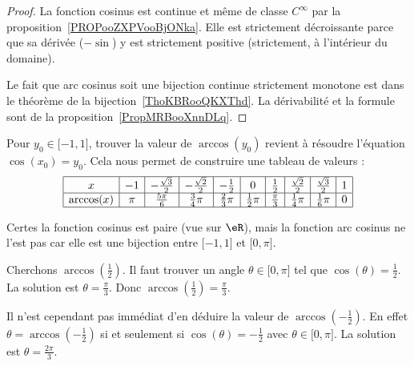 	\begin{proof}
		La fonction cosinus est continue et même de classe \(  C^{\infty}\) par la proposition~\ref{PROPooZXPVooBjONka}. Elle est strictement décroissante parce que sa dérivée (\( -\sin\)) y est strictement positive (strictement, à l'intérieur du domaine).

		Le fait que arc cosinus soit une bijection continue strictement monotone est dans le théorème de la bijection~\ref{ThoKBRooQKXThd}. La dérivabilité et la formule sont de la proposition~\ref{PropMRBooXnnDLq}.
	\end{proof}

	Pour \( y_0\in\mathopen[ -1 , 1 \mathclose]\), trouver la valeur de \( \arccos(y_0)\) revient à résoudre l'équation \( \cos(x_0)=y_0\). Cela nous permet de construire une tableau de valeurs :
	\begin{equation*}
		\begin{array}[]{|c|c|c|c|c|c|c|c|c|c|}
			\hline
			x          & -1  & -\frac{ \sqrt{3} }{2} & -\frac{ \sqrt{2} }{2} & -\frac{ 1 }{2}     & 0                & \frac{ 1 }{2}     & \frac{ \sqrt{2} }{2} & \frac{ \sqrt{3} }{2} & 1 \\
			\hline
			\arccos(x) & \pi & \frac{ 5\pi }{ 6 }    & \frac{ 3 }{ 4 }\pi    & \frac{ 2 }{ 3 }\pi & \frac{ 1 }{2}\pi & \frac{ \pi }{ 3 } & \frac{1}{ 4 }\pi     & \frac{1}{ 6 }\pi     & 0 \\
			\hline
		\end{array}
	\end{equation*}

	\begin{remark}
		Certes la fonction cosinus est paire (vue sur \( \eR\)), mais la fonction arc cosinus ne l'est pas car elle est une bijection entre \(\mathopen[ -1 , 1 \mathclose]\) et \(\mathopen[ 0 , \pi \mathclose]\).
	\end{remark}

	\begin{example}
		Cherchons \( \arccos(\frac{ 1 }{2})\). Il faut trouver un angle \( \theta\in\mathopen[ 0 , \pi \mathclose]\) tel que \( \cos(\theta)=\frac{ 1 }{2}\). La solution est \( \theta=\frac{ \pi }{ 3 }\). Donc \( \arccos(\frac{ 1 }{2})=\frac{ \pi }{ 3 }\).

		Il n'est cependant pas immédiat d'en déduire la valeur de \( \arccos(-\frac{ 1 }{2})\). En effet \( \theta=\arccos(-\frac{ 1 }{2})\) si et seulement si \( \cos(\theta)=-\frac{ 1 }{2}\) avec \( \theta\in\mathopen[ 0 , \pi \mathclose]\). La solution est \( \theta=\frac{ 2\pi }{ 3 }\).
	\end{example}

